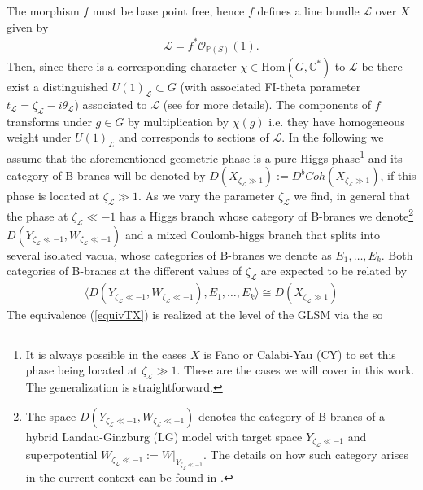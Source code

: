 \documentclass[a4paper,11pt]{article}
\numberwithin{equation}{section}
\begin{document}
The morphism $f$ must be base point free, hence $f$ defines 
a line bundle $\mathcal{L}$ over $X$ given by
\begin{eqnarray}
\mathcal{L}=f^{*}\mathcal{O}_{\mathbb{P}(S)}(1).
\end{eqnarray}
Then, since there is a corresponding character $\chi\in 
\mathrm{Hom}(G,\mathbb{C}^{*})$ to 
$\mathcal{L}$ be there exist a distinguished 
$U(1)_{\mathcal{L}}\subset G$ (with associated FI-theta parameter 
$t_{\mathcal{L}}=\zeta_{\mathcal{L}}-i\theta_{\mathcal{L}}$) associated to 
$\mathcal{L}$ (see \cite{Chen:2020iyo} for more details). The  
components of $f$ transforms under $g\in G$ by multiplication by $\chi(g)$ 
i.e. they have homogeneous weight under $U(1)_{\mathcal{L}}$ and 
corresponds to 
sections of $\mathcal{L}$. In the following we assume that the aforementioned 
geometric phase is 
a 
pure Higgs phase\footnote{It is always possible in the cases $X$ is Fano or 
Calabi-Yau (CY) to set this phase being located at $\zeta_{\mathcal{L}}\gg 1$. 
These  are the cases we will cover in this work. The 
generalization is straightforward.} and its category of B-branes will be denoted 
by $D(X_{\zeta_{\mathcal{L}}\gg 1}):=D^{b}Coh(X_{\zeta_{\mathcal{L}}\gg 1})$, 
if this phase is located at 
$\zeta_{\mathcal{L}}\gg 1$. As we vary the parameter $\zeta_{\mathcal{L}}$ we 
find, in general that the phase at $\zeta_{\mathcal{L}}\ll -1$ has a Higgs 
branch whose category of B-branes we denote\footnote{The space 
$D(Y_{\zeta_{\mathcal{L}}\ll -1},W_{\zeta_{\mathcal{L}}\ll -1})$ denotes the 
category of B-branes of a hybrid Landau-Ginzburg (LG) model with target space 
$Y_{\zeta_{\mathcal{L}}\ll -1}$ and superpotential $W_{\zeta_{\mathcal{L}}\ll 
-1}:=W|_{Y_{\zeta_{\mathcal{L}}\ll -1}}$. The details on how such category 
arises in the current context can be 
found in \cite{Chen:2020iyo}.} $D(Y_{\zeta_{\mathcal{L}}\ll 
-1},W_{\zeta_{\mathcal{L}}\ll -1})$ and a mixed Coulomb-higgs branch that splits 
into several isolated vacua, whose categories of B-branes we denote as 
$E_{1},\ldots,E_{k}$. Both categories of B-branes at the different values of 
$\zeta_{\mathcal{L}}$ are expected to be related by 
\cite{ballard2019variation,Hori:2013ika,hori2019notes,Clingempeel:2018iub}
\begin{eqnarray}\label{equivTX}
\langle D(Y_{\zeta_{\mathcal{L}}\ll -1},W_{\zeta_{\mathcal{L}}\ll 
-1}),E_{1},\ldots,E_{k} \rangle\cong D(X_{\zeta_{\mathcal{L}}\gg 1})
\end{eqnarray}
The equivalence (\ref{equivTX}) is realized at the level of the GLSM via the so 
\end{document}
